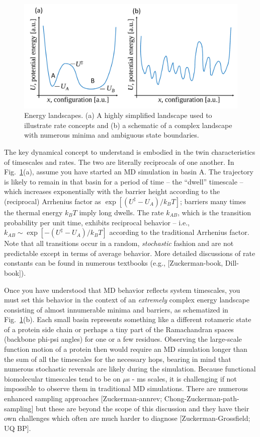\documentclass[9pt,bestpractices]{livecoms}
\begin{document}
\begin{figure}[h]
\centering
\includegraphics[width=\linewidth]{simplelandscapes.pdf}
\caption{Energy landscapes.  (a) A highly simplified landscape used to illustrate rate concepts and (b) a schematic of a complex landscape with numerous minima and ambiguous state boundaries.}
\label{landscapes}
\end{figure}

The key dynamical concept to understand is embodied in the twin characteristics of timescales and rates.  
The two are literally reciprocals of one another.  
In Fig.\ \ref{landscapes}(a), assume you have started an MD simulation in basin A.  
The trajectory is likely to remain in that basin for a period of time -- the “dwell” timescale -- which increases exponentially with the barrier height according to the (reciprocal) Arrhenius factor as $\exp[(U^\ddagger - U_A)/k_B T]$; barriers many times the thermal energy $k_BT$ imply long dwells.  
The rate $k_{AB}$, which is the transition probability per unit time, exhibits reciprocal behavior -- i.e., $k_{AB} \sim \exp[-(U^\ddagger - U_A)/k_B T]$ according to the traditional Arrhenius factor.  
Note that all transitions occur in a random, \emph{stochastic} fashion and are not predictable except in terms of average behavior.  
More detailed discussions of rate constants can be found in numerous textbooks (e.g., [Zuckerman-book, Dill-book]).

Once you have understood that MD behavior reflects system timescales, you must set this behavior in the context of an \emph{extremely} complex energy landscape consisting of almost innumerable minima and barriers, as schematized in Fig.\ \ref{landscapes}(b).  
Each small basin represents something like a different rotameric state of a protein side chain or perhaps a tiny part of the Ramachandran spaces (backbone phi-psi angles) for one or a few residues.  
Observing the large-scale function motion of a protein then would require an MD simulation longer than the sum of all the timescales for the necessary hops, bearing in mind that numerous stochastic reversals are likely during the simulation.  
Because functional biomolecular timescales tend to be on $\mu$s - ms scales, it is challenging if not impossible to observe them in traditional MD simulations.  
There are numerous enhanced sampling approaches [Zuckerman-annrev; Chong-Zuckerman-path-sampling] but these are beyond the scope of this discussion and they have their own challenges which often are much harder to diagnose [Zuckerman-Grossfield; UQ BP].
\end{document}
